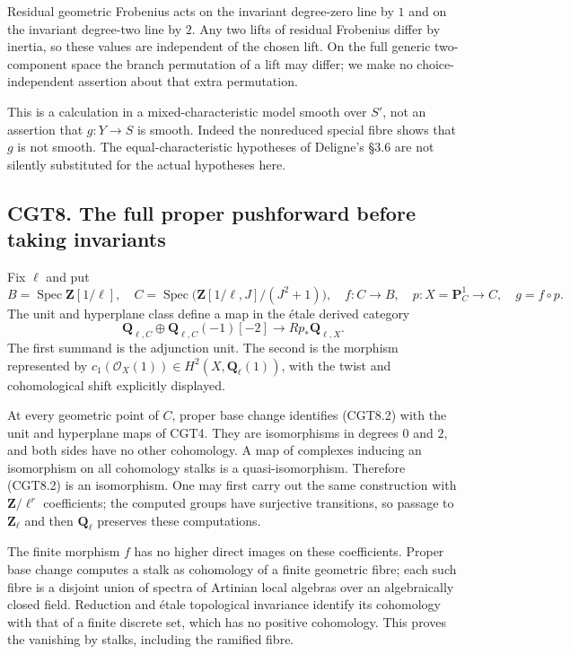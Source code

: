 Residual geometric Frobenius acts on the invariant degree-zero line by
\(1\) and on the invariant degree-two line by \(2\). Any two lifts of
residual Frobenius differ by inertia, so these values are independent of
the chosen lift. On the full generic two-component space the branch
permutation of a lift may differ; we make no choice-independent
assertion about that extra permutation.

This is a calculation in a mixed-characteristic model smooth over
\(S'\), not an assertion that \(g:Y\to S\) is smooth. Indeed the
nonreduced special fibre shows that \(g\) is not smooth. The
equal-characteristic hypotheses of Deligne's §3.6 are not silently
substituted for the actual hypotheses here.

\subsection{CGT8. The full proper pushforward before taking
invariants}\label{cgt8.-the-full-proper-pushforward-before-taking-invariants}

Fix \(\ell\) and put \[
B=\operatorname{Spec}\mathbf Z[1/\ell],\quad
C=\operatorname{Spec}\bigl(\mathbf Z[1/\ell,J]/(J^2+1)\bigr),
\quad f:C\to B,\quad p:X=\mathbf P^1_C\to C,\quad g=f\circ p.
\tag{CGT8.1}
\] The unit and hyperplane class define a map in the étale derived
category \[
\mathbf Q_{\ell,C}\oplus
\mathbf Q_{\ell,C}(-1)[-2]\longrightarrow Rp_*\mathbf Q_{\ell,X}.
\tag{CGT8.2}
\] The first summand is the adjunction unit. The second is the morphism
represented by \(c_1(\mathcal O_X(1))\in H^2(X,\mathbf Q_\ell(1))\),
with the twist and cohomological shift explicitly displayed.

At every geometric point of \(C\), proper base change identifies
(CGT8.2) with the unit and hyperplane maps of CGT4. They are
isomorphisms in degrees \(0\) and \(2\), and both sides have no other
cohomology. A map of complexes inducing an isomorphism on all cohomology
stalks is a quasi-isomorphism. Therefore (CGT8.2) is an isomorphism. One
may first carry out the same construction with \(\mathbf Z/\ell^r\)
coefficients; the computed groups have surjective transitions, so
passage to \(\mathbf Z_\ell\) and then \(\mathbf Q_\ell\) preserves
these computations.

The finite morphism \(f\) has no higher direct images on these
coefficients. Proper base change computes a stalk as cohomology of a
finite geometric fibre; each such fibre is a disjoint union of spectra
of Artinian local algebras over an algebraically closed field. Reduction
and étale topological invariance identify its cohomology with that of a
finite discrete set, which has no positive cohomology. This proves the
vanishing by stalks, including the ramified fibre.

